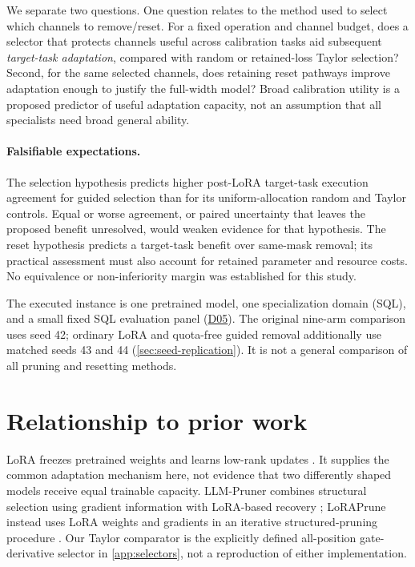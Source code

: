 \documentclass[10pt,letterpaper]{article}
\DeclareRobustCommand{\dataset}[1]{\hyperlink{dataset-#1}{\textnormal{#1}}}
\begin{document}
We separate two questions. One question relates to the method used to
select which channels to remove/reset. For a fixed operation and channel budget,
does a selector that protects channels useful across calibration tasks aid
subsequent \emph{target-task adaptation}, compared with random or
retained-loss Taylor selection? Second, for the same selected channels,
does retaining reset pathways improve adaptation enough to justify the
full-width model? Broad calibration utility is a proposed predictor of useful
adaptation capacity, not an assumption that all specialists need broad
general ability.

\paragraph{Falsifiable expectations.}
The selection hypothesis predicts higher post-LoRA target-task execution
agreement for guided selection than for its uniform-allocation random and
Taylor controls. Equal or worse agreement, or paired uncertainty that leaves
the proposed benefit unresolved, would weaken evidence for that hypothesis.
The reset hypothesis predicts a target-task benefit over same-mask removal;
its practical assessment must also account for retained parameter and resource
costs. No equivalence or non-inferiority margin was established for this study.

The executed instance is one pretrained model, one specialization domain (SQL),
and a small fixed SQL evaluation panel (\dataset{D05}). The original nine-arm
comparison uses seed 42; ordinary LoRA and quota-free guided removal additionally
use matched seeds 43 and 44 (\autoref{sec:seed-replication}). It is not a
general comparison of all pruning and resetting methods.

\section{Relationship to prior work}
\label{sec:related}

LoRA freezes pretrained weights and learns low-rank updates
\citep{hu2022lora}. It supplies the common adaptation mechanism here, not
evidence that two differently shaped models receive equal trainable capacity.
LLM-Pruner combines structural selection using gradient information with
LoRA-based recovery \citep{ma2023llmpruner}; LoRAPrune instead uses LoRA
weights and gradients in an iterative structured-pruning procedure
\citep{zhang2024loraprune}. Our Taylor comparator is the explicitly defined
all-position gate-derivative selector in \autoref{app:selectors}, not a
reproduction of either implementation.
\end{document}
